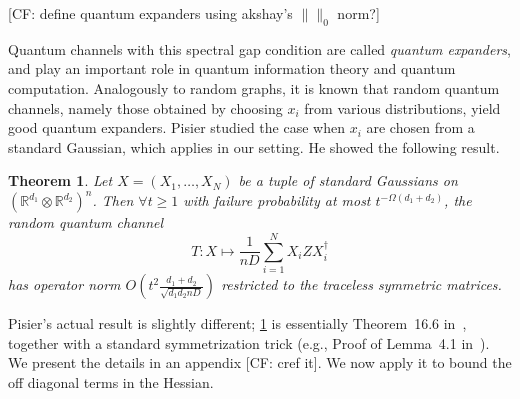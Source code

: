 \documentclass{article}
\newtheorem{theorem}{Theorem}
\newtheorem{corollary}[theorem]{Corollary}
\newcommand{\R}{{\mathbb{R}}}
\newcommand{\ot}{\otimes}
\newcommand\Sym{\mathcal{S}}
\newcommand\samp{x}
\newcommand\tr{\operatorname{Tr}}
\newcommand{\CF}[1]{{\color{purple}[CF: #1]}}
\newcommand{\AR}[1]{{\color{orange}[AR: #1]}}
\newcommand{\TODO}[1]{{\color{blue}[TODO: #1]}}
\begin{document}
\CF{define quantum expanders using akshay's $\|\|_0$ norm?}

Quantum channels with this spectral gap condition are called \emph{quantum expanders}, and play an important role in quantum information theory and quantum computation. Analogously to random graphs, it is known that random quantum channels, namely those obtained by choosing $x_i$ from various distributions, yield good quantum expanders. Pisier studied the case when $x_i$ are chosen from a standard Gaussian, which applies in our setting. He showed the following result. 


\begin{theorem}\label{thm:hess-pisier} Let $X = (X_1, \dots, X_N)$ be a tuple of standard Gaussians on $(\R^{d_1}\ot \R^{d_2})^n$. Then $\forall t \geq 1$ with failure probability at most $t^{-\Omega(d_{1} + d_{2})}$, the random quantum channel 
$$T: X \mapsto \frac{1}{nD}\sum_{i = 1}^N X_i Z X_i^\dagger$$
has operator norm 
$O \left( t^{2} \frac{d_{1}+d_{2}}{\sqrt{d_{1} d_{2} nD}} \right)$ restricted to the traceless symmetric matrices. \end{theorem}
Pisier's actual result is slightly different; \cref{thm:hess-pisier} is essentially Theorem~16.6 in~\cite{pisier2012grothendieck}, together with a standard symmetrization trick (e.g., Proof of Lemma~4.1 in~\cite{P14}). We present the details in an appendix \CF{cref it}. We now apply it to bound the off diagonal terms in the Hessian.


\end{document}
